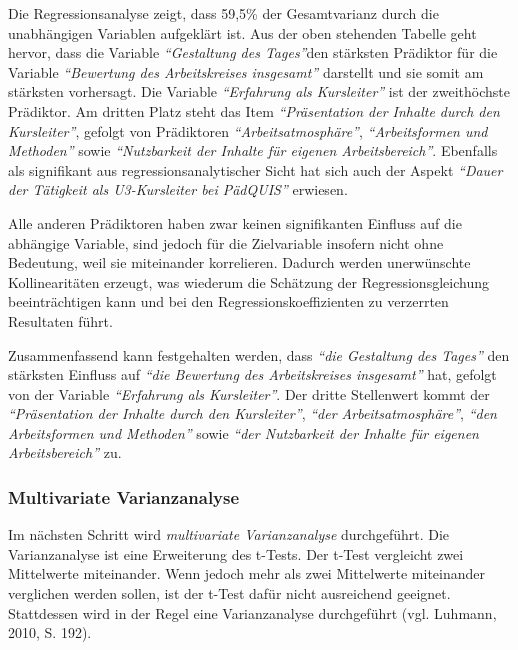 \documentclass[12pt,a4paper]{article}
\begin{document}
Die Regressionsanalyse zeigt, dass 59,5\% der Gesamtvarianz durch die unabhängigen Variablen aufgeklärt ist. Aus der oben stehenden Tabelle geht hervor, dass die Variable \textit{"`Gestaltung des Tages"'}den stärksten Prädiktor für die Variable \textit{"`Bewertung des Arbeitskreises insgesamt"'} darstellt und sie somit am stärksten vorhersagt. Die Variable \textit{"`Erfahrung als Kursleiter"'} ist der zweithöchste Prädiktor. Am dritten Platz steht das Item \textit{"`Präsentation der Inhalte durch den Kursleiter"'}, gefolgt von Prädiktoren \textit{"`Arbeitsatmosphäre"'},  \textit{"`Arbeitsformen und Methoden"'} sowie \textit{"`Nutzbarkeit der Inhalte für eigenen Arbeitsbereich"'}. Ebenfalls als signifikant aus regressionsanalytischer Sicht hat sich auch der Aspekt \textit{"`Dauer der Tätigkeit als U3-Kursleiter bei PädQUIS"'} erwiesen. 

Alle anderen Prädiktoren haben zwar keinen signifikanten Einfluss auf die abhängige Variable, sind jedoch für die Zielvariable insofern nicht ohne Bedeutung, weil sie miteinander korrelieren. Dadurch werden unerwünschte Kollinearitäten erzeugt, was wiederum die Schätzung der Regressionsgleichung beeinträchtigen kann und bei den Regressionskoeffizienten zu verzerrten Resultaten führt. 

Zusammenfassend kann festgehalten werden, dass \textit{"`die Gestaltung des Tages"'} den stärksten Einfluss auf \textit{"`die Bewertung des Arbeitskreises insgesamt"'} hat, gefolgt von der Variable \textit{"`Erfahrung als Kursleiter"'}. Der dritte Stellenwert kommt der \textit{"`Präsentation der Inhalte durch den Kursleiter"'}, \textit{"`der Arbeitsatmosphäre"'},  \textit{"`den Arbeitsformen und Methoden"'} sowie \textit{"`der Nutzbarkeit der Inhalte für eigenen Arbeitsbereich"'} zu. 

\subsubsection{Multivariate Varianzanalyse}

Im nächsten Schritt wird \textit{multivariate Varianzanalyse} durchgeführt. Die Varianzanalyse ist eine Erweiterung des t-Tests. Der t-Test vergleicht zwei Mittelwerte miteinander. Wenn jedoch mehr als zwei Mittelwerte miteinander verglichen werden sollen, ist der t-Test dafür nicht ausreichend geeignet. Stattdessen wird in der Regel eine Varianzanalyse durchgeführt (vgl. Luhmann, 2010, S. 192).
\end{document}
